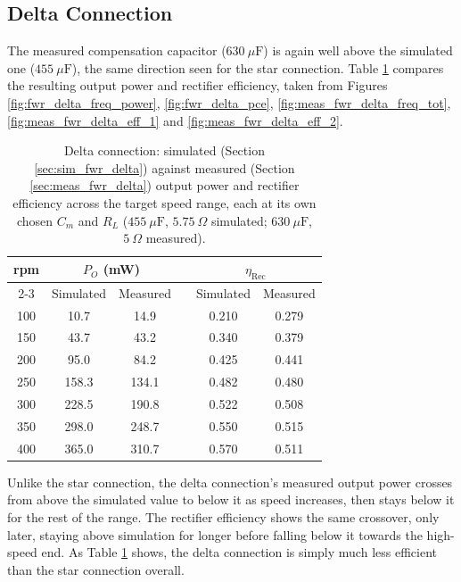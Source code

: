 \subsection{Delta Connection}
\label{sec:comp_fwr_delta}

The measured compensation capacitor ($630\ \mu\text{F}$) is again well above the simulated one ($455\ \mu\text{F}$), the same direction seen for the star connection. Table \ref{tab:comp_fwr_delta} compares the resulting output power and rectifier efficiency, taken from Figures \ref{fig:fwr_delta_freq_power}, \ref{fig:fwr_delta_pce}, \ref{fig:meas_fwr_delta_freq_tot}, \ref{fig:meas_fwr_delta_eff_1} and \ref{fig:meas_fwr_delta_eff_2}.

\begin{table}[htbp]
    \centering
    \begin{tabular}{cccccc}
        \toprule
        \multirow{2}{*}{rpm} & \multicolumn{2}{c}{$P_O$ (mW)} & & \multicolumn{2}{c}{$\eta_\text{Rec}$} \\
        \cmidrule{2-3} \cmidrule{5-6}
        & Simulated & Measured & & Simulated & Measured \\
        \midrule
        100 & 10.7  & 14.9  & & 0.210 & 0.279 \\
        150 & 43.7  & 43.2  & & 0.340 & 0.379 \\
        200 & 95.0  & 84.2  & & 0.425 & 0.441 \\
        250 & 158.3 & 134.1 & & 0.482 & 0.480 \\
        300 & 228.5 & 190.8 & & 0.522 & 0.508 \\
        350 & 298.0 & 248.7 & & 0.550 & 0.515 \\
        400 & 365.0 & 310.7 & & 0.570 & 0.511 \\
        \bottomrule
    \end{tabular}
    \caption{Delta connection: simulated (Section \ref{sec:sim_fwr_delta}) against measured (Section \ref{sec:meas_fwr_delta}) output power and rectifier efficiency across the target speed range, each at its own chosen $C_m$ and $R_L$ ($455\ \mu\text{F}$, $5.75\ \Omega$ simulated; $630\ \mu\text{F}$, $5\ \Omega$ measured).}
    \label{tab:comp_fwr_delta}
\end{table}

Unlike the star connection, the delta connection's measured output power crosses from above the simulated value to below it as speed increases, then stays below it for the rest of the range. The rectifier efficiency shows the same crossover, only later, staying above simulation for longer before falling below it towards the high-speed end. As Table \ref{tab:comp_fwr_delta} shows, the delta connection is simply much less efficient than the star connection overall.

